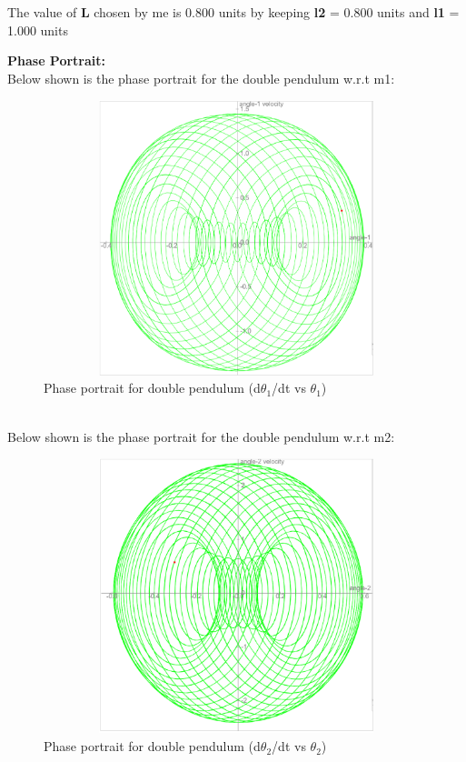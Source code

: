\documentclass[11pt]{scrartcl} %
\begin{document}
The value of \textbf{L} chosen by me is 0.800 units by keeping \textbf{l2} = 0.800 units and \textbf{l1} = 1.000 units

\textbf{Phase Portrait:}\\
Below shown is the phase portrait for the double pendulum w.r.t m1:
\begin{figure}[h] %
	\centering
	\includegraphics[width=12cm, height=8cm]{4b_phase(1).PNG} %
	\caption{Phase portrait for double pendulum (d$\theta_{1}$/dt vs $\theta_{1}$)}
\end{figure}
\\
Below shown is the phase portrait for the double pendulum w.r.t m2:
\begin{figure}[h] %
	\centering
	\includegraphics[width=12cm, height=8cm]{4b_phase(2).PNG} %
	\caption{Phase portrait for double pendulum (d$\theta_{2}$/dt vs $\theta_{2}$)}
\end{figure}
\end{document}
